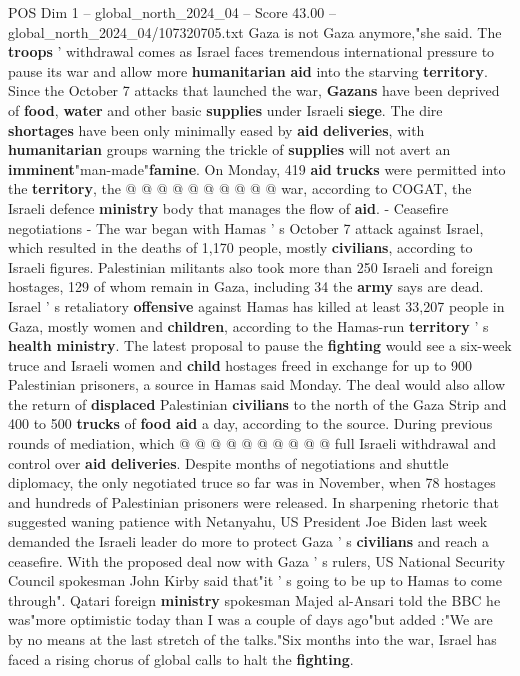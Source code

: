 \begin{textsample}{POS Dim 1 – global\_north\_2024\_04 – Score 43.00 – global\_north\_2024\_04/107320705.txt}
Gaza is not Gaza anymore,"she said.
The \textbf{troops} ' withdrawal comes as Israel faces tremendous international pressure to pause its war and allow more \textbf{humanitarian} \textbf{aid} into the starving \textbf{territory}.
Since the October 7 attacks that launched the war, \textbf{Gazans} have been deprived of \textbf{food}, \textbf{water} and other basic \textbf{supplies} under Israeli \textbf{siege}.
The dire \textbf{shortages} have been only minimally eased by \textbf{aid} \textbf{deliveries}, with \textbf{humanitarian} groups warning the trickle of \textbf{supplies} will not avert an \textbf{imminent}"man-made"\textbf{famine}.
On Monday, 419 \textbf{aid} \textbf{trucks} were permitted into the \textbf{territory}, the @ @ @ @ @ @ @ @ @ @ war, according to COGAT, the Israeli defence \textbf{ministry} body that manages the flow of \textbf{aid}. - Ceasefire negotiations - The war began with Hamas ' s October 7 attack against Israel, which resulted in the deaths of 1,170 people, mostly \textbf{civilians}, according to Israeli figures.
Palestinian militants also took more than 250 Israeli and foreign hostages, 129 of whom remain in Gaza, including 34 the \textbf{army} says are dead.
Israel ' s retaliatory \textbf{offensive} against Hamas has killed at least 33,207 people in Gaza, mostly women and \textbf{children}, according to the Hamas-run \textbf{territory} ' s \textbf{health} \textbf{ministry}.
The latest proposal to pause the \textbf{fighting} would see a six-week truce and Israeli women and \textbf{child} hostages freed in exchange for up to 900 Palestinian prisoners, a source in Hamas said Monday.
The deal would also allow the return of \textbf{displaced} Palestinian \textbf{civilians} to the north of the Gaza Strip and 400 to 500 \textbf{trucks} of \textbf{food} \textbf{aid} a day, according to the source.
During previous rounds of mediation, which @ @ @ @ @ @ @ @ @ @ full Israeli withdrawal and control over \textbf{aid} \textbf{deliveries}.
Despite months of negotiations and shuttle diplomacy, the only negotiated truce so far was in November, when 78 hostages and hundreds of Palestinian prisoners were released.
In sharpening rhetoric that suggested waning patience with Netanyahu, US President Joe Biden last week demanded the Israeli leader do more to protect Gaza ' s \textbf{civilians} and reach a ceasefire.
With the proposed deal now with Gaza ' s rulers, US National Security Council spokesman John Kirby said that"it ' s going to be up to Hamas to come through".
Qatari foreign \textbf{ministry} spokesman Majed al-Ansari told the BBC he was"more optimistic today than I was a couple of days ago"but added :"We are by no means at the last stretch of the talks."Six months into the war, Israel has faced a rising chorus of global calls to halt the \textbf{fighting}.

\end{textsample}
